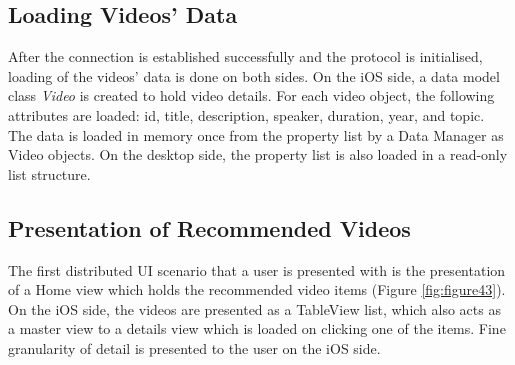 \subsection{Loading Videos' Data}
After the connection is established successfully and the protocol is
initialised, loading of the videos' data is done on both sides. On the iOS side,
a data model class \textit{Video} is created to hold video details. For each
video object, the following attributes are loaded: id, title, description,
speaker, duration, year, and topic. The data is loaded in memory once from the
property list by a Data Manager as Video objects. On the desktop side, the property list is also loaded in a read-only list structure.

\subsection{Presentation of Recommended Videos}
The first distributed UI scenario that a user is presented with is the
presentation of a Home view which holds the recommended video items (Figure
\ref{fig:figure43}). On the iOS side, the videos are presented as a TableView
list, which also acts as a master view to a details view  which is loaded on
clicking one of the items. Fine granularity of detail is presented to the user
on the iOS side.
